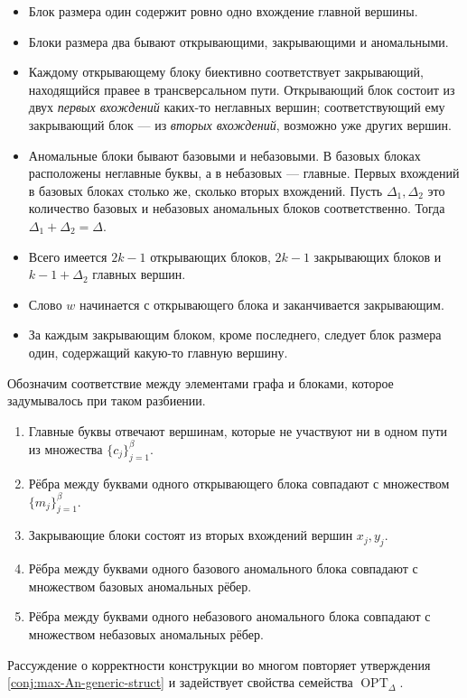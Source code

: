 \documentclass{article}
\theoremstyle{definition}
\newcommand{\OPT}{\operatorname{OPT}}
\newcommand{\D}{\Delta}
\begin{document}
\begin{itemize}
    \item Блок размера один содержит ровно одно вхождение главной вершины. 
    \item Блоки размера два бывают открывающими, закрывающими и аномальными.
    \item Каждому открывающему блоку биективно соответствует 
    закрывающий, находящийся правее в трансверсальном пути. Открывающий блок состоит из двух \emph{первых вхождений} каких-то неглавных вершин; соответствующий ему закрывающий блок — из \emph{вторых вхождений}, возможно уже других вершин.
    \item Аномальные блоки бывают базовыми и небазовыми. В базовых блоках расположены неглавные буквы, а в небазовых — главные. Первых вхождений в базовых блоках столько же, сколько вторых вхождений. Пусть $\D_1, \D_2$ это количество базовых и небазовых аномальных блоков соответственно. Тогда $\D_1 + \D_2 = \D$.
    \item Всего имеется \(2k - 1\) открывающих блоков, \(2k - 1\) 
    закрывающих блоков и \(k - 1 + \D_2\) главных вершин.
    \item Слово \(w\) начинается с открывающего блока и заканчивается 
    закрывающим.
    \item За каждым закрывающим блоком, кроме последнего, следует блок 
    размера один, содержащий какую-то главную вершину.
\end{itemize}

Обозначим соответствие между элементами графа и блоками, которое задумывалось при таком разбиении.
\begin{enumerate}
    \item Главные буквы отвечают вершинам, которые не участвуют ни в одном пути из множества \(\{c_j\}_{j=1}^\beta\).
    \item Рёбра между буквами одного открывающего блока 
    совпадают с множеством \(\{m_j\}_{j=1}^\beta\).
    \item Закрывающие блоки состоят из вторых вхождений вершин 
    \(x_j, y_j\).
    \item Рёбра между буквами одного базового аномального блока совпадают с множеством базовых аномальных рёбер.
    \item Рёбра между буквами одного небазового аномального блока совпадают с множеством небазовых аномальных рёбер.
\end{enumerate}
Рассуждение о корректности конструкции во многом повторяет утверждения \ref{conj:max-An-generic-struct} и задействует свойства семейства $\OPT_\D$.
\end{document}
